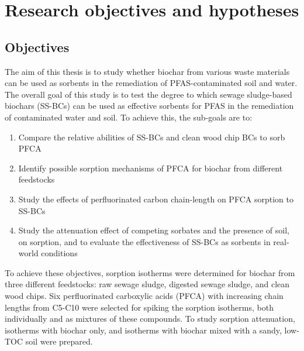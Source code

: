\chapter{Research objectives and hypotheses}\label{chap:Objectives}
\section{Objectives}\label{sec:objectives}
The aim of this thesis is to study whether biochar from various waste materials can be used as sorbents in the remediation of PFAS-contaminated soil and water. The overall goal of this study is to test the degree to which sewage sludge-based biochars (\acrshort{SS-BCs}) can be used as effective sorbents for PFAS in the remediation of contaminated water and soil. To achieve this, the sub-goals are to:

\begin{enumerate}[label=\Roman*]
    \item{Compare the relative abilities of SS-BCs and clean wood chip BCs to sorb PFCA}
    \item{Identify possible sorption mechanisms of PFCA for biochar from different feedstocks}
    \item{Study the effects of perfluorinated carbon chain-length on PFCA sorption to SS-BCs}
    \item{Study the attenuation effect of competing sorbates and the presence of soil, on sorption, and to evaluate the effectiveness of SS-BCs as sorbents in real-world conditions}
\end{enumerate}

To achieve these objectives, sorption isotherms were determined for biochar from three different feedstocks: raw sewage sludge, digested sewage sludge, and clean wood chips. Six perfluorinated carboxylic acids (PFCA) with increasing chain lengths from C5-C10 were selected for spiking the sorption isotherms, both individually and as mixtures of these compounds. To study sorption attenuation, isotherms with biochar only, and isotherms with biochar mixed with a sandy, low-\acrshort{TOC} soil were prepared.

